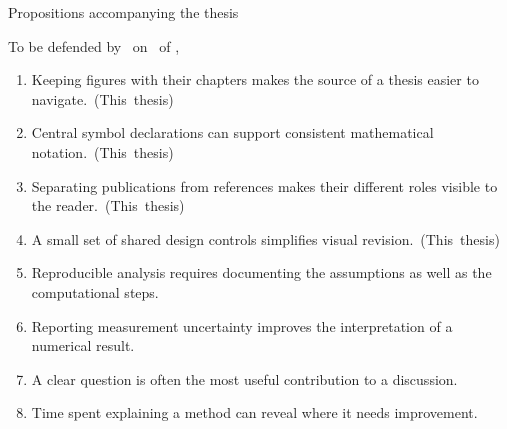 \documentclass[11pt]{memoir}
\begin{document}
\frontmatter
\pagestyle{empty}
\centering

{\Large Propositions accompanying the thesis}

\vspace*{2\bigskipamount}

{\LARGE\bfseries\thesistitle}
\vspace{0.5cm}

{\normalfont\Large\scshape\thesissubtitle}

\vspace*{1\bigskipamount}
To be defended by \thesisauthor ~on  ~of , \thesisyear
\vspace*{10mm}

\begin{enumerate}[itemsep=1pt]
\item Keeping figures with their chapters makes the source of a thesis easier
to navigate.~(This~thesis)
\item Central symbol declarations can support consistent mathematical notation.~(This~thesis)
\item Separating publications from references makes their different roles
visible to the reader.~(This~thesis)
\item A small set of shared design controls simplifies visual revision.~(This~thesis)
\item Reproducible analysis requires documenting the assumptions as well as
the computational steps.
\item Reporting measurement uncertainty improves the interpretation of a
numerical result.
\item A clear question is often the most useful contribution to a discussion.
\item Time spent explaining a method can reveal where it needs improvement.
\end{enumerate}
\end{document}
